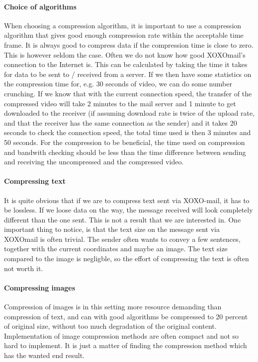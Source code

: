 \paragraph{Choice of algorithms}\hfill
\newline
When choosing a compression algorithm, it is important to use a compression algorithm that gives good enough compression rate within the acceptable time frame. It is always good to compress data if the compression time is close to zero. This is however seldom the case.
\newline
\newline
Often we do not know how good XOXOmail's connection to the Internet is. This can be calculated by taking the time it takes for data to be sent to / received from a server. If we then have some statistics on the compression time for, e.g. 30 seconds of video, we can do some number crunching. If we know that with the current connection speed, the transfer of the compressed video will take 2 minutes to the mail server and 1 minute to get downloaded to the receiver (if assuming download rate is twice of the upload rate, and that the receiver has the same connection as the sender) and it takes 20 seconds to check the connection speed, the total time used is then 3 minutes and 50 seconds. For the compression to be beneficial, the time used on compression and bandwith checking should be less than the time difference between sending and receiving the uncompressed and the compressed video.

\paragraph{Compressing text} \hfill
\newline
It is quite obvious that if we are to compress text sent via XOXO-mail, it has to be lossless. If we loose data on the way, the message received will look completely different than the one sent. This is not a result that we are interested in. One important thing to notice, is that the text size on the message sent via XOXOmail is often trivial. The sender often wants to convey a few sentences, together with the current coordinates and maybe an image. The text size compared to the image is negligble, so the effort of compressing the text is often not worth it. %

\paragraph{Compressing images} \hfill
\newline
Compression of images is in this setting more resource demanding than compression of text, and can with good algorithms be compressed to 20 percent of original size, without too much degradation of the original content. Implementation of image compression methods are often compact and not so hard to implement. It is just a matter of finding the compression method which has the wanted end result.

